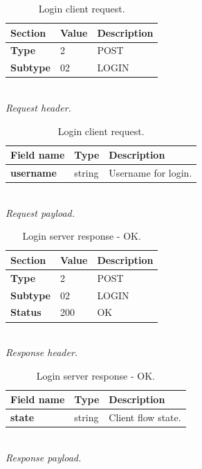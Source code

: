 \documentclass[english, sem, kiv, he, iso690alph, pdf, viewonly]{fasthesis}
\begin{document}
\begin{table}[h]
	\centering
	\begin{minipage}[b]{0.45\textwidth}
		\centering
		\begin{tabular}{|l|l|l|}
			\hline
			\textbf{Section} & \textbf{Value} & \textbf{Description} \\ \hline
			\textbf{Type} & 2 & \footnotesize{POST} \\ \hline
			\textbf{Subtype} & 02 & \footnotesize{LOGIN} \\ \hline
		\end{tabular} \\
		\textit{Request header.}
	\end{minipage} 
	\hfill
	\begin{minipage}[b]{0.5\textwidth}
		\centering
		\begin{tabular}{|l|l|p{70pt}|}
			\hline
			\textbf{Field name} & \textbf{Type} & \textbf{Description} \\ \hline
			\textbf{username} & string & Username for login. \\ \hline
		\end{tabular} \\
		\textit{Request payload.}
	\end{minipage}	
	\caption{Login client request.}
	\label{tab:login_client_request}
\end{table}

\begin{table}[h]
	\centering
	\begin{minipage}[b]{0.45\textwidth}
		\centering
		\begin{tabular}{|l|l|l|}
			\hline
			\textbf{Section} & \textbf{Value} & \textbf{Description} \\ \hline
				\textbf{Type} & 2 & \footnotesize{POST} \\ \hline
			\textbf{Subtype} & 02 & \footnotesize{LOGIN} \\ \hline
			\textbf{Status} & 200 & \footnotesize{OK} \\ \hline
		\end{tabular} \\
		\textit{Response header.}
	\end{minipage} 
	\hfill
	\begin{minipage}[b]{0.5\textwidth}
		\centering
		\begin{tabular}{|l|l|p{70pt}|}
			\hline
			\textbf{Field name} & \textbf{Type} & \textbf{Description} \\ \hline
			\textbf{state} & string & Client flow state. \\ \hline
		\end{tabular} \\
		\textit{Response payload.}
	\end{minipage}	
	\caption{Login server response - OK.}
	\label{tab:login_server_response_ok}
\end{table}
\end{document}
